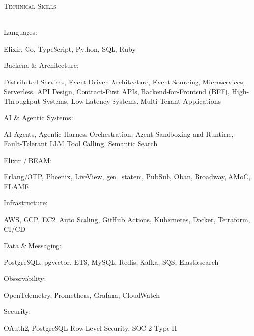 \documentclass[a4paper]{article}
\newcommand{\lineunder} {
    \vspace*{-8pt} \\
    \hspace*{-18pt} \hrulefill \\
}
\newcommand{\header} [1] {
    {\hspace*{-18pt}\vspace*{6pt} \textsc{#1}}
    \vspace*{-6pt} \lineunder
}
\begin{document}
\header{Technical Skills}
\begingroup
\setlength{\parindent}{0pt}
\noindent\parbox[t]{0.23\textwidth}{\raggedright Languages:}\hfill\parbox[t]{0.75\textwidth}{\raggedright Elixir, Go, TypeScript, Python, SQL, Ruby\par}\par
\vspace{0.35mm}
\noindent\parbox[t]{0.23\textwidth}{\raggedright Backend \& Architecture:}\hfill\parbox[t]{0.75\textwidth}{\raggedright Distributed Services, Event-Driven Architecture, Event Sourcing, Microservices, Serverless, API Design, Contract-First APIs, Backend-for-Frontend (BFF), High-Throughput Systems, Low-Latency Systems, Multi-Tenant Applications\par}\par
\vspace{0.35mm}
\noindent\parbox[t]{0.23\textwidth}{\raggedright AI \& Agentic Systems:}\hfill\parbox[t]{0.75\textwidth}{\raggedright AI Agents, Agentic Harness Orchestration, Agent Sandboxing and Runtime, Fault-Tolerant LLM Tool Calling, Semantic Search\par}\par
\vspace{0.35mm}
\noindent\parbox[t]{0.23\textwidth}{\raggedright Elixir / BEAM:}\hfill\parbox[t]{0.75\textwidth}{\raggedright Erlang/OTP, Phoenix, LiveView, gen\_statem, PubSub, Oban, Broadway, AMoC, FLAME\par}\par
\vspace{0.35mm}
\noindent\parbox[t]{0.23\textwidth}{\raggedright Infrastructure:}\hfill\parbox[t]{0.75\textwidth}{\raggedright AWS, GCP, EC2, Auto Scaling, GitHub Actions, Kubernetes, Docker, Terraform, CI/CD\par}\par
\vspace{0.35mm}
\noindent\parbox[t]{0.23\textwidth}{\raggedright Data \& Messaging:}\hfill\parbox[t]{0.75\textwidth}{\raggedright PostgreSQL, pgvector, ETS, MySQL, Redis, Kafka, SQS, Elasticsearch\par}\par
\vspace{0.35mm}
\noindent\parbox[t]{0.23\textwidth}{\raggedright Observability:}\hfill\parbox[t]{0.75\textwidth}{\raggedright OpenTelemetry, Prometheus, Grafana, CloudWatch\par}\par
\vspace{0.35mm}
\noindent\parbox[t]{0.23\textwidth}{\raggedright Security:}\hfill\parbox[t]{0.75\textwidth}{\raggedright OAuth2, PostgreSQL Row-Level Security, SOC 2 Type II\par}\par
\endgroup
\vspace{2mm}
\end{document}
